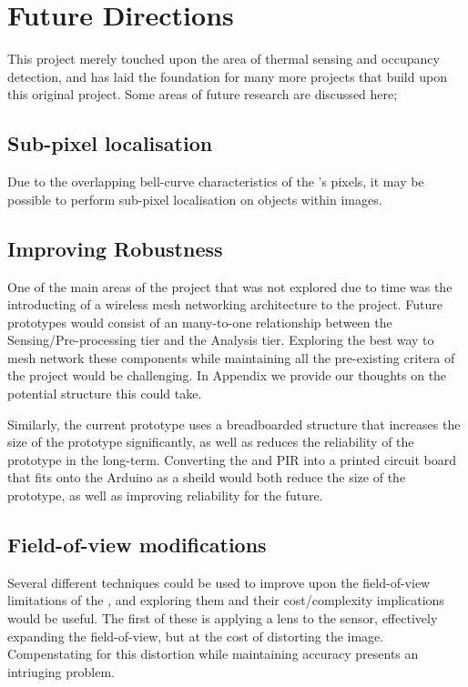 \documentclass[../thesis/thesis.tex]{subfiles}
\begin{document}
\section{Future Directions}
This project merely touched upon the area of thermal sensing and occupancy detection, and has laid the foundation for many more projects that build upon this original project. Some areas of future research are discussed here;

\subsection{Sub-pixel localisation}
Due to the overlapping bell-curve characteristics of the \mlx's pixels, it may be possible to perform sub-pixel localisation on objects within images. %

\subsection{Improving Robustness}
One of the main areas of the project that was not explored due to time was the introducting of a wireless mesh networking architecture to the project. Future prototypes would consist of an many-to-one relationship between the Sensing/Pre-processing tier and the Analysis tier. Exploring the best way to mesh network these components while maintaining all the pre-existing critera of the project would be challenging. In Appendix  we provide our thoughts on the potential structure this could take.

Similarly, the current prototype uses a breadboarded structure that increases the size of the prototype significantly, as well as reduces the reliability of the prototype in the long-term. Converting the \mlx and PIR into a printed circuit board that fits onto the Arduino as a sheild would both reduce the size of the prototype, as well as improving reliability for the future.

\subsection{Field-of-view modifications}
Several different techniques could be used to improve upon the field-of-view limitations of the \mlx, and exploring them and their cost/complexity implications would be useful. The first of these is applying a lens to the sensor, effectively expanding the field-of-view, but at the cost of distorting the image. Compenstating for this distortion while maintaining accuracy presents an intriuging problem.
\end{document}
